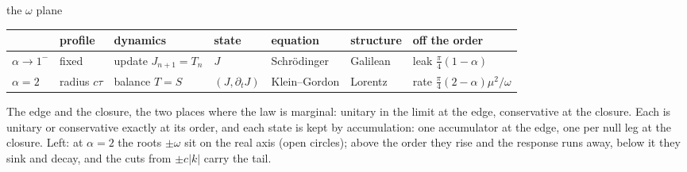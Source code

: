 \documentclass[10pt]{article}
\begin{document}
\vspace{2pt}
\begin{minipage}[c]{0.21\linewidth}\centering
{}\par
{\scriptsize the $\omega$ plane}
\end{minipage}\hfill
\begin{minipage}[c]{0.78\linewidth}
{\small\renewcommand{\arraystretch}{1.05}\setlength{\tabcolsep}{3pt}
\begin{tabular}{@{}l l l l l l l@{}}
\toprule
 & \textbf{profile} & \textbf{dynamics} & \textbf{state} & \textbf{equation} & \textbf{structure} & \textbf{off the order}\\
\midrule
$\alpha\to1^-$ & fixed & update $J_{n+1}=T_n$ & $J$ & Schr\"odinger & Galilean & leak $\tfrac\pi4(1-\alpha)$\\
$\alpha=2$ & radius $c\tau$ & balance $T=S$ & $(J,\partial_tJ)$ & Klein--Gordon & Lorentz & rate $\tfrac\pi4(2-\alpha)\mu^2/\omega$\\
\bottomrule
\end{tabular}}\par\vspace{2pt}
{\small The edge and the closure, the two places where the law is marginal: unitary in the limit at the edge, conservative at the closure. Each is unitary or conservative exactly at its order, and each state is kept by accumulation: one accumulator at the edge, one per null leg at the closure. Left: at $\alpha=2$ the roots $\pm\omega$ sit on the real axis (open circles); above the order they rise and the response runs away, below it they sink and decay, and the cuts from $\pm c|k|$ carry the tail.}
\end{minipage}
\end{document}
